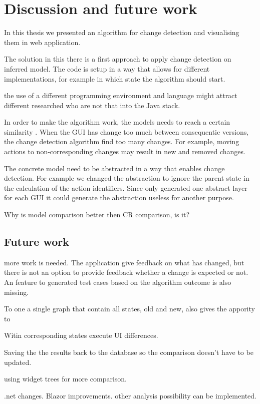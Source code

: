 \chapter{Discussion and future work}
In this thesis we presented an algorithm for change detection and visualising them in web application. 


The solution in this there is a first approach to apply change detection on inferred model. The code is setup in a way that allows for different implementations, for example in which state the algorithm should start. 

the use of a different programming environment and language might attract different researched who are not that into the Java stack.

In order to make the algorithm work, the models needs to reach a certain similarity \cite{andrews2009visual}. When the GUI has change too much between consequentic versions, the change detection algorithm find too many changes. For example, moving actions to non-corresponding changes may result in new and removed changes. 

The concrete model need to be abstracted in a way that enables change detection. For example we changed the abstraction to ignore the parent state in the calculation of the action identifiers. Since \testar only generated one abstract layer for each GUI it could generate the abstraction useless for another purpose.


Why is model comparison better then CR comparison, is it? 


\section{Future work} \label{sec:future-work}

more work is needed. The application give feedback on what has changed, but there is not an option to provide feedback whether a change is expected or not. An feature to generated test cases based on the algorithm outcome is also missing. 


To one a single graph that contain all states, old and new, also gives the appority to 


Witin corresponding states execute UI differences.

Saving the the results back to the database so the comparison doesn't have to be updated.

using widget trees for more comparison.

.net changes.
Blazor improvements. 
other analysis possibility can be implemented. 